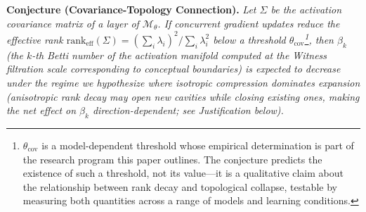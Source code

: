 \documentclass{article}
\begin{document}
\medskip
\noindent\textbf{Conjecture (Covariance-Topology Connection).}\label{conj:covariance-topology} \emph{Let $\Sigma$ be the activation covariance matrix of a layer of $\mathcal{M}_\theta$. If concurrent gradient updates reduce the effective rank $\text{rank}_{\text{eff}}(\Sigma) = (\sum_i \lambda_i)^2 / \sum_i \lambda_i^2$ below a threshold $\theta_{\text{cov}}$\footnote{$\theta_{\text{cov}}$ is a model-dependent threshold whose empirical determination is part of the research program this paper outlines. The conjecture predicts the existence of such a threshold, not its value---it is a qualitative claim about the relationship between rank decay and topological collapse, testable by measuring both quantities across a range of models and learning conditions.}, then $\beta_k$ (the $k$-th Betti number of the activation manifold computed at the Witness filtration scale corresponding to conceptual boundaries) is expected to decrease under the regime we hypothesize where isotropic compression dominates expansion (anisotropic rank decay may open new cavities while closing existing ones, making the net effect on $\beta_k$ direction-dependent; see Justification below).}
\end{document}
